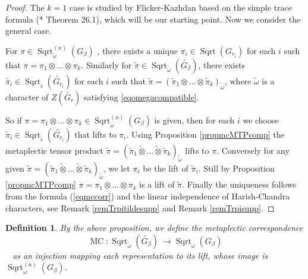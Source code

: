 \documentclass{amsart}
\numberwithin{equation}{section}
\newtheorem{definition}[theorem]{\bf{Definition}}
\newcommand{\mrsqrt}{\operatorname{Sqrt}}
\newcommand{\mrtemp}{\operatorname{Temp}}
\newcommand{\mrmc}{\operatorname{MC}}
\newcommand{\wt}[1]{\widetilde{#1}}
\begin{document}
	\begin{proof}
		
		The $k=1$ case is studied by Flicker-Kazhdan based on the simple trace formula (\cite{flicker1986metaplectic}*{ Theorem 26.1}), which will be our starting point. Now we consider the general case. 
		
		For $\pi\in\mrsqrt^{(n)}_{\omega}(G_{\beta})$ 
		, there exists a unique $\pi_{i}\in\mrsqrt(G_{r_{i}})$ 
		for each $i$ such that $\pi=\pi_{1}\otimes\dots\otimes\pi_{k}$. Similarly for $\wt{\pi}\in\mrsqrt_{\wt{\omega}}(\wt{G_{\beta}})$, there exists  $\wt{\pi_{i}}\in\mrsqrt_{\epsilon}(\wt{G_{r_{i}}})$ for each $i$
		such that $\wt{\pi}=(\wt{\pi}_{1}\otimes\dots\otimes\wt{\pi}_{k})_{\wt{\omega}}$, where $\wt{\omega}$ is a character of $Z(\wt{G_{r}})$ satisfying \eqref{eqomegacompatible}. 
		
		So if $\pi=\pi_{1}\otimes\dots\otimes\pi_{k}\in\mrsqrt^{(n)}_{\omega}(G_{\beta})$ is given, then for each $i$ we choose $\wt{\pi}_{i}\in\mrsqrt_{\epsilon}(\wt{G_{r_{i}}})$ that lifts to $\pi_{i}$. Using Proposition \ref{propmcMTPcomp} the metaplectic tensor product $\wt{\pi}=(\wt{\pi}_{1}\wt{\otimes}\dots\wt{\otimes}\wt{\pi}_{k})_{\wt{\omega}}$ lifts to $\pi$. Conversely for any given $\wt{\pi}=(\wt{\pi}_{1}\wt{\otimes}\dots\wt{\otimes}\wt{\pi}_{k})_{\wt{\omega}}$, we let $\pi_{i}$ be the lift of $\wt{\pi}_{i}$. Still by Proposition \ref{propmcMTPcomp} $\pi=\pi_{1}\otimes\dots\otimes\pi_{k}$ is a lift of $\wt{\pi}$. Finally the uniqueness follows from the formula (\ref{eqmccorr}) and the linear independence of Harish-Chandra characters, see Remark \ref{remTrpitildesupp} and Remark \ref{remTrpisupp}.
		
	\end{proof}
	
	\begin{definition}
		
		By the above proposition, we define the \emph{metaplectic correspondence}
		$$\mrmc:\mrsqrt_{\wt{\omega}}(\wt{G_{\beta}})\ %
		\longrightarrow \mrsqrt_{\omega}(G_{\beta})$$\ %
		as an injection mapping each representation to its lift, whose image is $ \mrsqrt^{(n)}_{\omega}(G_{\beta})$. %
		
	\end{definition}
	
\end{document}
